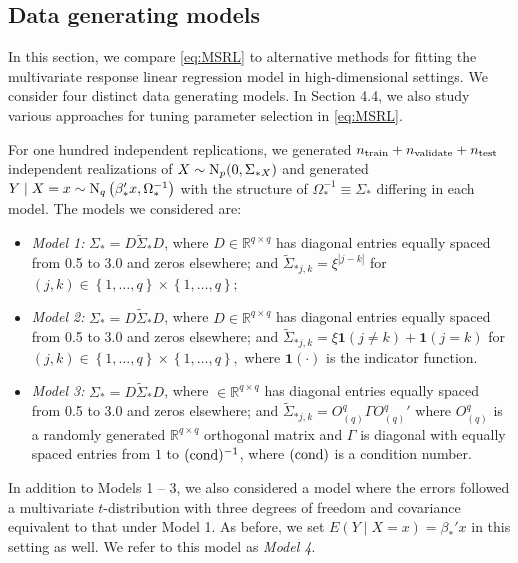 \documentclass[12pt]{article}
\begin{document}
\subsection{Data generating models}
In this section, we compare \eqref{eq:MSRL} to alternative methods for fitting the multivariate response linear regression model in high-dimensional settings. We consider four distinct data generating models. In Section 4.4, we also study various approaches for tuning parameter selection in \eqref{eq:MSRL}.

For one hundred independent replications, we generated $n_{\rm train} + n_{\rm validate} + n_{\rm test}$ independent realizations of $X \sim {\rm N}_p(0, \Sigma_{*X})$ and generated $Y \mid X = x \sim {\rm N}_q\left(\beta_*'x, \Omega_*^{-1}\right)$ with the structure of $\Omega_*^{-1} \equiv \Sigma_*$ differing in each model. The models we considered are:
\begin{itemize}
\item[]\textit{Model 1:} $\Sigma_* = D \tilde{\Sigma}_* D$, where $D \in \mathbb{R}^{q \times q}$ has diagonal entries equally spaced from 0.5 to 3.0 and zeros elsewhere; and $\tilde{\Sigma}_{*j,k} = \xi^{|j-k|}$ for $(j,k) \in \left\{1, \dots, q\right\} \times \left\{1,\dots, q\right\};$ 
\item[]\textit{Model 2:} $\Sigma_* = D \tilde{\Sigma}_* D$, where $D \in \mathbb{R}^{q \times q}$ has diagonal entries equally spaced from 0.5 to 3.0 and zeros elsewhere; and $\tilde{\Sigma}_{*j,k} = \xi \mathbf{1}(j \neq k) + \mathbf{1}(j = k)$ for $(j,k) \in \left\{1, \dots, q\right\} \times \left\{1,\dots, q\right\},$ where $\mathbf{1}(\cdot)$ is the indicator function. 
\item[]\textit{Model 3:} $\Sigma_* = D \tilde{\Sigma}_* D$, where $\in \mathbb{R}^{q \times q}$ has diagonal entries equally spaced from 0.5 to 3.0 and zeros elsewhere; and $\tilde{\Sigma}_{*j,k} = O_{(q)}^q\Gamma {O_{(q)}^q}'$ where $O_{(q)}^q$ is a randomly generated $\mathbb{R}^{q \times q}$ orthogonal matrix and $\Gamma$ is diagonal with equally spaced entries from $1$ to $({\rm cond})^{-1}$, where $({\rm cond})$ is a condition number.
\end{itemize}

In addition to Models 1 -- 3, we also considered a model where the errors followed a multivariate $t$-distribution with three degrees of freedom and covariance equivalent to that under Model 1. As before, we set $E(Y \mid X = x) = \beta_*'x$ in this setting as well. We refer to this model as \textit{Model 4}. 
\end{document}
